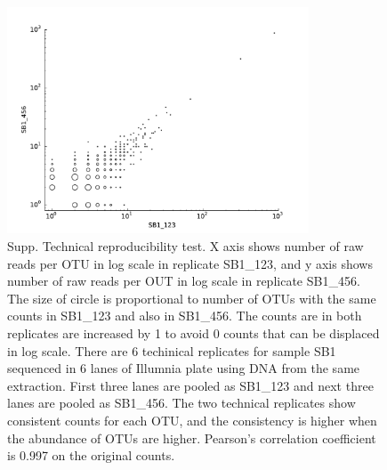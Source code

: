 \documentclass[12pt]{article}
\begin{document}
\begin{figure}[tbph!]
  \centering
  \includegraphics[width=0.8\textwidth]{figs/SB1_techrep_OTUscat}
  \caption[Technical reproducibilty test]{Supp. Technical reproducibility test. X axis shows number of raw reads per OTU in log scale in replicate SB1\_123, and y axis shows number of raw reads per OUT in log scale in replicate SB1\_456. The size of circle is proportional to number of OTUs with the same counts in SB1\_123 and also in SB1\_456. The counts are in both replicates are increased by 1 to avoid 0 counts that can be displaced in log scale. There are 6 techinical replicates for sample SB1 sequenced in 6 lanes of Illumnia plate using DNA from the same extraction. First three lanes are pooled as SB1\_123 and next three lanes are pooled as SB1\_456. The two technical replicates show consistent counts for each OTU, and the consistency is higher when the abundance of OTUs are higher. Pearson’s correlation coefficient is 0.997 on the original counts.}
  \label{fig:SB1_techrep_OTUscat}
\end{figure}
\end{document}
